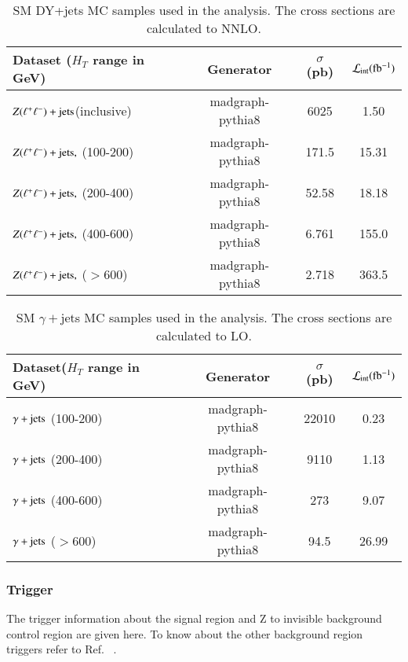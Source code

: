 \begin{table}[h]
\centering
\caption{SM DY+jets MC samples used in the analysis. The cross
  sections are calculated to NNLO. }
\label{tab:dyjetsMCsamples}
{\footnotesize
\begin{tabular}{lccc}
\hline \hline
Dataset ($H_{T}$ range in GeV) & Generator & $\sigma$ (pb) & ${\cal L}_{\rm int}(\rm fb^{-1})$ \\
\hline
$Z(\ell^{+} \ell^{-})+{\rm jets}$(inclusive) & madgraph-pythia8 & 6025 & 1.50\\
$Z(\ell^{+} \ell^{-})+{\rm jets},$ (100-200) & madgraph-pythia8 & 171.5 & 15.31\\
$Z(\ell^{+} \ell^{-})+{\rm jets},$ (200-400) & madgraph-pythia8 & 52.58 & 18.18\\
$Z(\ell^{+} \ell^{-})+{\rm jets},$ (400-600)  & madgraph-pythia8 & 6.761 & 155.0\\
$Z(\ell^{+} \ell^{-})+{\rm jets},$ ($> $600)  & madgraph-pythia8 & 2.718 & 363.5\\
\hline \hline
\end{tabular}
}
\end{table}

\begin{table}[h]
\centering
\caption{SM $\gamma+$jets MC samples used in the analysis. The cross
  sections are calculated to LO. }
\label{tab:gjetsMCsamples}
{\footnotesize
\begin{tabular}{lccc}
\hline \hline
Dataset($H_{T}$ range in GeV) & Generator & $\sigma$ (pb) & ${\cal L}_{\rm int}(\rm fb^{-1})$ \\
\hline
$\gamma +{\rm jets}$ (100-200) & madgraph-pythia8 & 22010 & 0.23\\
$\gamma +{\rm jets}$ (200-400) & madgraph-pythia8 & 9110 & 1.13\\
$\gamma +{\rm jets}$ (400-600) & madgraph-pythia8 & 273 & 9.07\\
$\gamma +{\rm jets}$ ($>$600) & madgraph-pythia8 & 94.5 & 26.99\\
\hline \hline
\end{tabular}
}
\end{table}
\clearpage

\subsubsection{Trigger}

The trigger information about the signal region and Z to invisible background control region are given here. To know about the other background region triggers refer to Ref.~\cite{CMS-PAS-SUS-15-002} .

